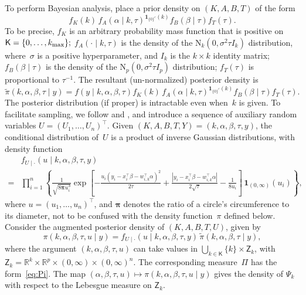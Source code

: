 \documentclass[12pt]{article}
\newcommand{\Z}{\mathsf{Z}}
\newcommand{\ind}{\mathbf{1}}
\begin{document}
To perform Bayesian analysis, place a prior density on $(K,A,B,T)$ of the form
\[
f_K(k) \, f_A(\alpha \mid k, \tau)^{\ind_{\{0\}^c}(k)} f_B(\beta \mid \tau) f_T(\tau).
\]
To be precise, $f_K$ is an arbitrary probability mass function that is positive on $\mathsf{K}= \{0, \dots, k_{\scriptsize \mbox{max}}\};$ 
$f_A(\cdot \mid k, \tau)$ is the density of the $\mbox{N}_k(0, \sigma^2 \tau I_k)$ distribution, where~$\sigma$ is a positive hyperparameter, and $I_k$ is the $k \times k$ identity matrix;
$f_B(\beta \mid \tau)$ is the density of the $\mbox{N}_p(0, \sigma^2 \tau I_p)$ distribution;
$f_T(\tau)$ is proportional to $\tau^{-1}$.
The resultant (un-normalized) posterior density is
\[
\tilde{\pi}(k, \alpha, \beta, \tau \mid y) = f(y \mid k, \alpha,\beta,\tau) f_K(k) \, f_A(\alpha \mid k, \tau)^{\ind_{\{0\}^c}(k)} f_B(\beta \mid \tau) f_T(\tau).
\]
The posterior distribution (if proper) is intractable even when~$k$ is given.
To facilitate sampling, we follow \cite{liu1996bayesian} and \cite{choi2013analysis}, and introduce a sequence of auxiliary random variables $U = (U_1, \dots, U_n)^{\top}$.
Given $(K,A,B,T,Y) = (k, \alpha, \beta, \tau,y)$, the conditional distribution of~$U$ is a product of inverse Gaussian distributions, with density function
\[
\begin{aligned}
	&f_{U \mid \cdot}(u \mid k, \alpha, \beta, \tau, y) \\
	=& \prod_{i=1}^n \left\{ \frac{1}{\sqrt{8\bm{\pi} u_i^3}} \exp \left[ -  \frac{u_i (y_i - x_i^{\top} \beta - w_{i,k}^{\top} \alpha )^2}{2\tau} + \frac{|y_i - x_i^{\top} \beta - w_{i,k}^{\top} \alpha|}{2\sqrt{\tau}}  - \frac{1}{8u_i} \right]  \, \ind_{(0,\infty)}(u_i) \right\},
\end{aligned}
\]
where $u = (u_1, \dots, u_n)^{\top}$, and $\bm{\pi}$ denotes the ratio of a circle's circumference to its diameter, not to be confused with the density function~$\pi$ defined below.
Consider the augmented posterior density of $(K, A, B, T, U)$, given by
\[
\pi(k,\alpha,\beta,\tau,u \mid y) = f_{U \mid \cdot}(u \mid k, \alpha, \beta, \tau, y) \, \tilde{\pi}(k, \alpha, \beta, \tau \mid y),
\]
where the argument $(k, \alpha, \beta, \tau, u)$ can take values in $\bigcup_{k \in \mathsf{K}} \{k\} \times \Z_k$, with $\Z_k = \mathbb{R}^k \times \mathbb{R}^p \times (0,\infty) \times (0,\infty)^n$.
The corresponding measure~$\Pi$ has the form~\eqref{eq:Pi}.
The map $(\alpha, \beta, \tau, u) \mapsto \pi(k, \alpha, \beta, \tau, u \mid y)$ gives the density of $\Psi_k$ with respect to the Lebesgue measure on $\Z_k$.
\end{document}
